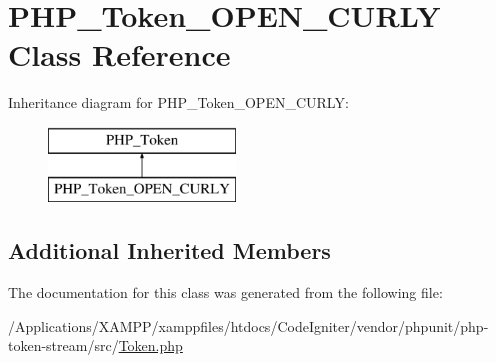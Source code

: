 \hypertarget{class_p_h_p___token___o_p_e_n___c_u_r_l_y}{}\section{P\+H\+P\+\_\+\+Token\+\_\+\+O\+P\+E\+N\+\_\+\+C\+U\+R\+LY Class Reference}
\label{class_p_h_p___token___o_p_e_n___c_u_r_l_y}
Inheritance diagram for P\+H\+P\+\_\+\+Token\+\_\+\+O\+P\+E\+N\+\_\+\+C\+U\+R\+LY\+:\begin{figure}[H]
\begin{center}
\leavevmode
\includegraphics[height=2.000000cm]{class_p_h_p___token___o_p_e_n___c_u_r_l_y}
\end{center}
\end{figure}
\subsection*{Additional Inherited Members}


The documentation for this class was generated from the following file\+:\begin{DoxyCompactItemize}
\item 
/\+Applications/\+X\+A\+M\+P\+P/xamppfiles/htdocs/\+Code\+Igniter/vendor/phpunit/php-\/token-\/stream/src/\mbox{\hyperlink{_token_8php}{Token.\+php}}\end{DoxyCompactItemize}
